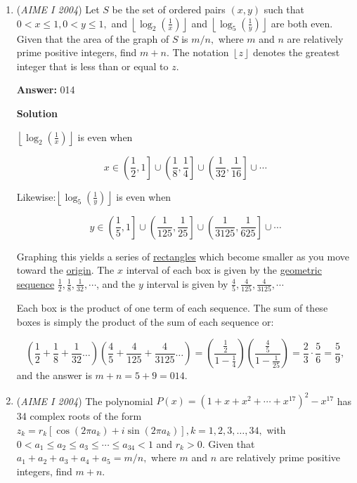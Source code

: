 \begin{enumerate}
 


	\item (\textit{AIME I 2004}) Let $S$ be the set of ordered pairs $(x, y)$ such that $0 < x \le 1, 0<y\le 1,$ and $\left \lfloor{\log_2{\left(\frac 1x\right)}}\right \rfloor$ and $\left \lfloor{\log_5{\left(\frac 1y\right)}}\right \rfloor$ are both even. Given that the area of the graph of $S$ is $m/n,$ where $m$ and $n$ are relatively prime positive integers, find $m+n.$ The notation $\left \lfloor{z}\right \rfloor$ denotes the greatest integer that is less than or equal to $z.$

 \textbf{Answer: }014



\textbf{Solution}

$\left\lfloor\log_2\left(\frac{1}{x}\right)\right\rfloor$ is even when

 
 \[x \in \left(\frac{1}{2},1\right] \cup \left(\frac{1}{8},\frac{1}{4}\right] \cup \left(\frac{1}{32},\frac{1}{16}\right] \cup \cdots\]

 Likewise:$\left\lfloor\log_5\left(\frac{1}{y}\right)\right\rfloor$ is even when

 
 \[y \in \left(\frac{1}{5},1\right] \cup \left(\frac{1}{125},\frac{1}{25}\right] \cup \left(\frac{1}{3125},\frac{1}{625}\right] \cup \cdots\]

 Graphing this yields a series of \href{https://artofproblemsolving.com/wiki/index.php?title=Rectangle}{rectangles} which become smaller as you move toward the \href{https://artofproblemsolving.com/wiki/index.php?title=Origin}{origin}. The $x$ interval of each box is given by the \href{https://artofproblemsolving.com/wiki/index.php?title=Geometric\_sequence}{geometric sequence} $\frac{1}{2} , \frac{1}{8}, \frac{1}{32}, \cdots$, and the $y$ interval is given by $\frac{4}{5} , \frac{4}{125}, \frac{4}{3125}, \cdots$

 Each box is the product of one term of each sequence. The sum of these boxes is simply the product of the sum of each sequence or:

 
 \[\left(\frac{1}{2} + \frac{1}{8} + \frac{1}{32} \ldots \right)\left(\frac{4}{5} + \frac{4}{125} + \frac{4}{3125} \ldots \right)=\left(\frac{\frac{1}{2}}{1 - \frac{1}{4}}\right)\left(\frac{\frac{4}{5}}{1-\frac{1}{25}}\right)= \frac{2}{3} \cdot \frac{5}{6} = \frac{5}{9},\] and the answer is $m+n = 5 + 9 = \boxed{014}$.

 


	\item (\textit{AIME I 2004}) The polynomial $P(x)=(1+x+x^2+\cdots+x^{17})^2-x^{17}$ has 34 complex roots of the form $z_k = r_k[\cos(2\pi a_k)+i\sin(2\pi a_k)], k=1, 2, 3,\ldots, 34,$ with $0 < a_1 \le a_2 \le a_3 \le \cdots \le a_{34} < 1$ and $r_k>0.$ Given that $a_1 + a_2 + a_3 + a_4 + a_5 = m/n,$ where $m$ and $n$ are relatively prime positive integers, find $m+n.$


\end{enumerate}
